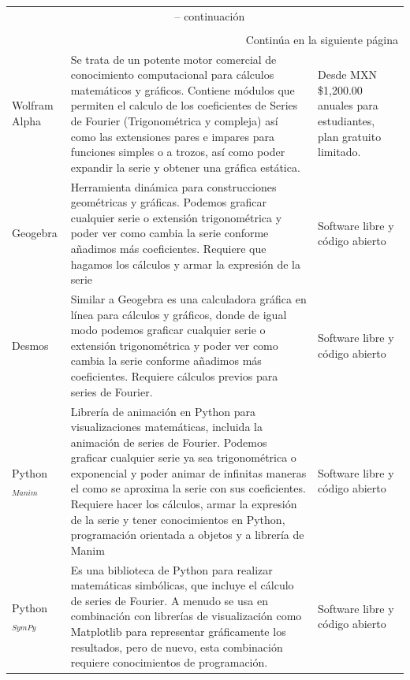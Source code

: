 \begin{longtable}{ | m{2.5cm} | m{6.5cm} | m{4cm} | }
	\rowcolor{black!75}
	\head {SOFTWARE} & \head {CARACTERÍSTICAS} & \head {PRECIO} \\ \hline
	\endfirsthead
	\multicolumn{3}{c}{{\tablename\ \thetable{} -- continuación}} \\
	\rowcolor{black!75}
	\head {SOFTWARE} & \head {CARACTERÍSTICAS} & \head {PRECIO} \\ \hline
	\endhead
	\hline \multicolumn{3}{r}{{Continúa en la siguiente página}} \\
	\endfoot
	\hline
	\endlastfoot
	Wolfram Alpha & Se trata de un potente motor comercial de conocimiento computacional para cálculos matemáticos y gráficos. Contiene módulos que permiten el calculo de los coeficientes de Series de Fourier (Trigonométrica y compleja) así como las extensiones pares e impares para funciones simples o a trozos, así como poder expandir la serie y obtener una gráfica estática.~\cite{wolfram2024}  & Desde MXN \$1,200.00 anuales para estudiantes, plan gratuito limitado. \\ \hline
	Geogebra & Herramienta dinámica para construcciones geométricas y gráficas. Podemos graficar cualquier serie o extensión trigonométrica y poder ver como cambia la serie conforme añadimos más coeficientes. Requiere que hagamos los cálculos y armar la expresión de la serie~\cite{GeoGebra2024} & Software libre y código abierto \\ \hline
	Desmos  & Similar a Geogebra es una calculadora gráfica en línea para cálculos y gráficos, donde de igual modo podemos graficar cualquier serie o extensión trigonométrica y poder ver como cambia la serie conforme añadimos más coeficientes. Requiere cálculos previos para series de Fourier.~\cite{Desmos2024} & Software libre y código abierto\\ \hline
	Python$_{Manim}$ & Librería de animación en Python para visualizaciones matemáticas, incluida la animación de series de Fourier. Podemos graficar cualquier serie ya sea trigonométrica o exponencial y poder animar de infinitas maneras el como se aproxima la serie con sus coeficientes. Requiere hacer los cálculos, armar la expresión de la serie y tener conocimientos en Python, programación orientada a objetos y a librería de Manim ~\cite{Manim2024} & Software libre y código abierto \\ \hline
	Python$_{SymPy}$ &Es una biblioteca de Python para realizar matemáticas simbólicas, que incluye el cálculo de series de Fourier. A menudo se usa en combinación con librerías de visualización como Matplotlib para representar gráficamente los resultados, pero de nuevo, esta combinación requiere conocimientos de programación.~\cite{Matplotlib-sympy2024} & Software libre y código abierto \\ \hline

\end{longtable}

